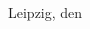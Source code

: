 \begin{titlepage}
\begin{addmargin}[-1cm]{-3cm}
\begin{center}

        Leipzig, den \myTime\vfill






%
%
%

    \end{center}
  \end{addmargin}
\end{titlepage}
